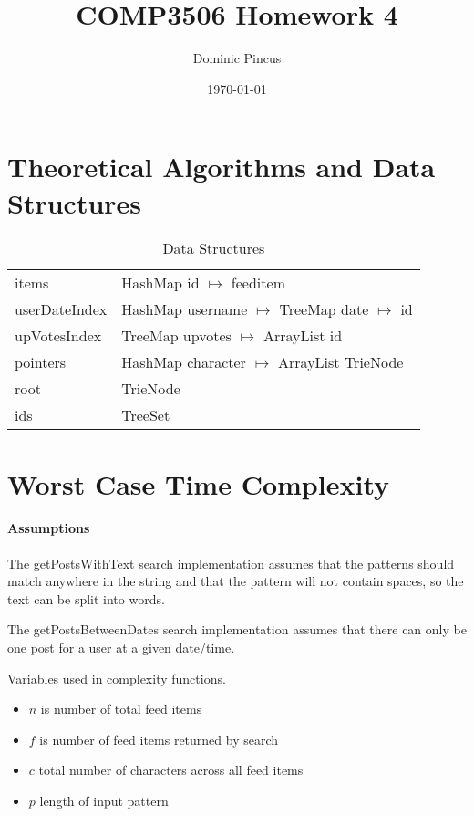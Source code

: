 \documentclass[11pt, oneside]{article}   	%
\title{COMP3506 Homework 4}
\author{Dominic Pincus}
\date{\today}
\begin{document}
\maketitle
\newpage

\section{Theoretical Algorithms and Data Structures}

\begin{table}[htp]
\caption{Data Structures}
\begin{center}
\begin{tabular}{l l}

items & HashMap id $\mapsto$ feeditem \\
userDateIndex & HashMap username $\mapsto$ TreeMap date $\mapsto$ id \\
upVotesIndex & TreeMap upvotes $\mapsto$ ArrayList id \\
pointers & HashMap character $\mapsto$ ArrayList TrieNode \\
root & TrieNode \\
ids & TreeSet \\

\end{tabular}
\end{center}
\label{default}
\end{table}

\section{Worst Case Time Complexity}

\paragraph{Assumptions}

The getPostsWithText search implementation assumes that the patterns should match anywhere in the string and that the pattern will not contain spaces, so the text can be split into words.

The getPostsBetweenDates search implementation assumes that there can only be one post for a user at a given date/time.

Variables used in complexity functions.

\begin{itemize}
\item $n$ is number of total feed items
\item $f$ is number of feed items returned by search
\item $c$ total number of characters across all feed items
\item $p$ length of input pattern
\end{itemize}
\end{document}
